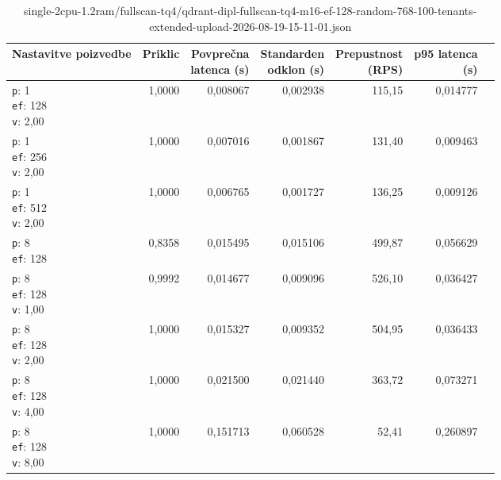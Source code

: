 \begin{table}[htbp]
  \centering
\small
  \caption{single-2cpu-1.2ram/fullscan-tq4/qdrant-dipl-fullscan-tq4-m16-ef-128-random-768-100-tenants-extended-upload-2026-08-19-15-11-01.json}
  \label{tab:single-2cpu-1.2ram:fullscan-tq4:qdrant-dipl-fullscan-tq4-m16-ef-128-random-768-100-tenants-extended-upload-2026-08-19-15-11-01.json}
  \begin{tabularx}{\textwidth}{Xrrrrrr}
    \toprule
    Nastavitve poizvedbe & Priklic & \makecell{Povprečna\\latenca (s)} & \makecell{Standarden\\odklon (s)} & \makecell{Prepustnost\\(RPS)} & \makecell{p95 latenca\\(s)}  \\
    \midrule
    \makecell{\texttt{p}: 1\\\texttt{ef}: 128\\\texttt{v}: 2,00} & 1,0000 & 0,008067 & 0,002938 & 115,15 & 0,014777 \\
    \makecell{\texttt{p}: 1\\\texttt{ef}: 256\\\texttt{v}: 2,00} & 1,0000 & 0,007016 & 0,001867 & 131,40 & 0,009463 \\
    \makecell{\texttt{p}: 1\\\texttt{ef}: 512\\\texttt{v}: 2,00} & 1,0000 & 0,006765 & 0,001727 & 136,25 & 0,009126 \\
    \makecell{\texttt{p}: 8\\\texttt{ef}: 128} & 0,8358 & 0,015495 & 0,015106 & 499,87 & 0,056629 \\
    \makecell{\texttt{p}: 8\\\texttt{ef}: 128\\\texttt{v}: 1,00} & 0,9992 & 0,014677 & 0,009096 & 526,10 & 0,036427 \\
    \makecell{\texttt{p}: 8\\\texttt{ef}: 128\\\texttt{v}: 2,00} & 1,0000 & 0,015327 & 0,009352 & 504,95 & 0,036433 \\
    \makecell{\texttt{p}: 8\\\texttt{ef}: 128\\\texttt{v}: 4,00} & 1,0000 & 0,021500 & 0,021440 & 363,72 & 0,073271 \\
    \makecell{\texttt{p}: 8\\\texttt{ef}: 128\\\texttt{v}: 8,00} & 1,0000 & 0,151713 & 0,060528 & 52,41 & 0,260897 \\

\end{tabularx}
\end{table}
